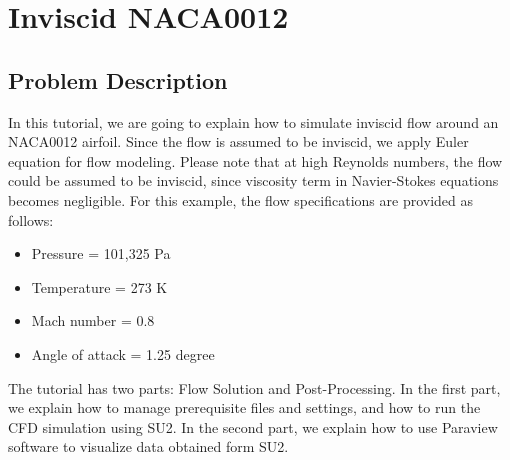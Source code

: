 \chapter{Inviscid NACA0012}
\label{ch:Inviscid NACA0012}
\section{Problem Description}
In this tutorial, we are going to explain how to simulate inviscid flow around an NACA0012 airfoil. Since the flow is assumed to be inviscid, we apply Euler equation for flow modeling. Please note that at high Reynolds numbers, the flow could be assumed to be inviscid, since viscosity term in Navier-Stokes equations becomes negligible. For this example, the flow specifications are provided as follows:
\begin{itemize}
    \item Pressure = 101,325 Pa
    \item Temperature = 273 K
    \item Mach number = 0.8
    \item Angle of attack = 1.25 degree
\end{itemize}
The tutorial has two parts: Flow Solution and Post-Processing. In the first part, we explain how to manage prerequisite files and settings, and how to run the CFD simulation using SU2. In the second part, we explain how to use Paraview software to visualize data obtained form SU2.
